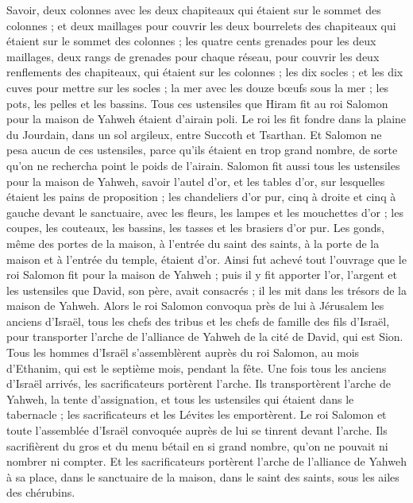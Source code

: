 \begin{multicols}{2}
Savoir, deux colonnes avec les deux chapiteaux qui étaient sur le sommet des colonnes ; et deux maillages pour couvrir les deux bourrelets des chapiteaux qui étaient sur le sommet des colonnes ;
les quatre cents grenades pour les deux maillages, deux rangs de grenades pour chaque réseau, pour couvrir les deux renflements des chapiteaux, qui étaient sur les colonnes ;
les dix socles ; et les dix cuves pour mettre sur les socles ;
la mer avec les douze bœufs sous la mer ;
les pots, les pelles et les bassins. Tous ces ustensiles que Hiram fit au roi Salomon pour la maison de Yahweh étaient d'airain poli.
Le roi les fit fondre dans la plaine du Jourdain, dans un sol argileux, entre Succoth et Tsarthan.
Et Salomon ne pesa aucun de ces ustensiles, parce qu'ils étaient en trop grand nombre, de sorte qu'on ne rechercha point le poids de l’airain.
Salomon fit aussi tous les ustensiles pour la maison de Yahweh, savoir l'autel d'or, et les tables d'or, sur lesquelles étaient les pains de proposition ;
les chandeliers d’or pur, cinq à droite et cinq à gauche devant le sanctuaire, avec les fleurs, les lampes et les mouchettes d'or ;
les coupes, les couteaux, les bassins, les tasses et les brasiers d’or pur. Les gonds, même des portes de la maison, à l’entrée du saint des saints, à la porte de la maison et à l’entrée du temple, étaient d'or.
Ainsi fut achevé tout l'ouvrage que le roi Salomon fit pour la maison de Yahweh ; puis il y fit apporter l'or, l’argent et les ustensiles que David, son père, avait consacrés ; il les mit dans les trésors de la maison de Yahweh.
\VerseOne{}Alors le roi Salomon convoqua près de lui à Jérusalem les anciens d'Israël, tous les chefs des tribus et les chefs de famille des fils d'Israël, pour transporter l'arche de l'alliance de Yahweh de la cité de David, qui est Sion.
Tous les hommes d'Israël s’assemblèrent auprès du roi Salomon, au mois d'Ethanim, qui est le septième mois, pendant la fête.
Une fois tous les anciens d'Israël arrivés, les sacrificateurs portèrent l'arche.
Ils transportèrent l'arche de Yahweh, la tente d'assignation, et tous les ustensiles qui étaient dans le tabernacle ; les sacrificateurs et les Lévites les emportèrent.
Le roi Salomon et toute l'assemblée d'Israël convoquée auprès de lui se tinrent devant l'arche. Ils sacrifièrent du gros et du menu bétail en si grand nombre, qu'on ne pouvait ni nombrer ni compter.
Et les sacrificateurs portèrent l'arche de l'alliance de Yahweh à sa place, dans le sanctuaire de la maison, dans le saint des saints, sous les ailes des chérubins.

\end{multicols}
